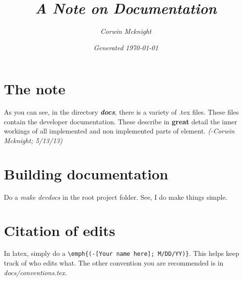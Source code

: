 \documentclass[12pt]{article}
\title{\emph{A Note on Documentation}}
\author{\emph{Corwin Mcknight}}
\date{\emph{Generated \today}}
\begin{document}
\maketitle

\section{The note}
As you can see, in the directory \emph{\textbf{docs}}, there is a variety of .tex files. These files contain the developer documentation. These describe in \textbf{great} detail the inner workings of all implemented and non implemented parts of element. \emph{(-Corwin Mcknight; 5/13/13)}
\section{Building documentation}
Do a  \emph{\color{blue} make devdocs} in the root project folder. See, I do make things simple.
\section{Citation of edits}
In latex, simply do a \verb:\emph{(-[Your name here]; M/DD/YY)}:. This helps keep track of who edits what. The other convention you are recommended is in \emph{docs/conventions.tex}.
\end{document}
